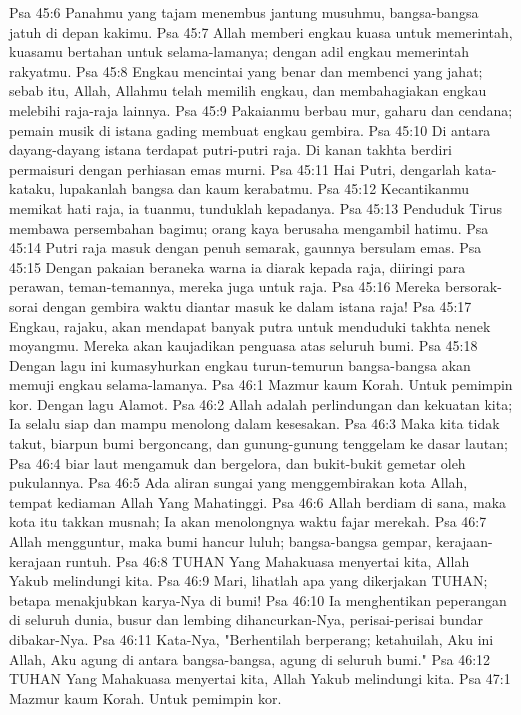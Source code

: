 Psa 45:6  Panahmu yang tajam menembus jantung musuhmu, bangsa-bangsa jatuh di depan kakimu.
Psa 45:7  Allah memberi engkau kuasa untuk memerintah, kuasamu bertahan untuk selama-lamanya; dengan adil engkau memerintah rakyatmu.
Psa 45:8  Engkau mencintai yang benar dan membenci yang jahat; sebab itu, Allah, Allahmu telah memilih engkau, dan membahagiakan engkau melebihi raja-raja lainnya.
Psa 45:9  Pakaianmu berbau mur, gaharu dan cendana; pemain musik di istana gading membuat engkau gembira.
Psa 45:10  Di antara dayang-dayang istana terdapat putri-putri raja. Di kanan takhta berdiri permaisuri dengan perhiasan emas murni.
Psa 45:11  Hai Putri, dengarlah kata-kataku, lupakanlah bangsa dan kaum kerabatmu.
Psa 45:12  Kecantikanmu memikat hati raja, ia tuanmu, tunduklah kepadanya.
Psa 45:13  Penduduk Tirus membawa persembahan bagimu; orang kaya berusaha mengambil hatimu.
Psa 45:14  Putri raja masuk dengan penuh semarak, gaunnya bersulam emas.
Psa 45:15  Dengan pakaian beraneka warna ia diarak kepada raja, diiringi para perawan, teman-temannya, mereka juga untuk raja.
Psa 45:16  Mereka bersorak-sorai dengan gembira waktu diantar masuk ke dalam istana raja!
Psa 45:17  Engkau, rajaku, akan mendapat banyak putra untuk menduduki takhta nenek moyangmu. Mereka akan kaujadikan penguasa atas seluruh bumi.
Psa 45:18  Dengan lagu ini kumasyhurkan engkau turun-temurun bangsa-bangsa akan memuji engkau selama-lamanya.
Psa 46:1  Mazmur kaum Korah. Untuk pemimpin kor. Dengan lagu Alamot.
Psa 46:2  Allah adalah perlindungan dan kekuatan kita; Ia selalu siap dan mampu menolong dalam kesesakan.
Psa 46:3  Maka kita tidak takut, biarpun bumi bergoncang, dan gunung-gunung tenggelam ke dasar lautan;
Psa 46:4  biar laut mengamuk dan bergelora, dan bukit-bukit gemetar oleh pukulannya.
Psa 46:5  Ada aliran sungai yang menggembirakan kota Allah, tempat kediaman Allah Yang Mahatinggi.
Psa 46:6  Allah berdiam di sana, maka kota itu takkan musnah; Ia akan menolongnya waktu fajar merekah.
Psa 46:7  Allah mengguntur, maka bumi hancur luluh; bangsa-bangsa gempar, kerajaan-kerajaan runtuh.
Psa 46:8  TUHAN Yang Mahakuasa menyertai kita, Allah Yakub melindungi kita.
Psa 46:9  Mari, lihatlah apa yang dikerjakan TUHAN; betapa menakjubkan karya-Nya di bumi!
Psa 46:10  Ia menghentikan peperangan di seluruh dunia, busur dan lembing dihancurkan-Nya, perisai-perisai bundar dibakar-Nya.
Psa 46:11  Kata-Nya, "Berhentilah berperang; ketahuilah, Aku ini Allah, Aku agung di antara bangsa-bangsa, agung di seluruh bumi."
Psa 46:12  TUHAN Yang Mahakuasa menyertai kita, Allah Yakub melindungi kita.
Psa 47:1  Mazmur kaum Korah. Untuk pemimpin kor.
